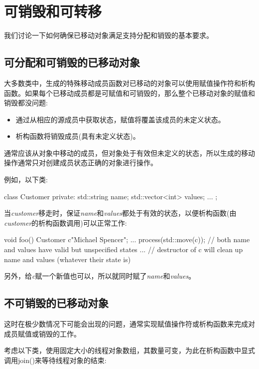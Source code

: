 \section{可销毁和可转移}
我们讨论一下如何确保已移动对象满足支持分配和销毁的基本要求。

\subsection{可分配和可销毁的已移动对象}

大多数类中，生成的特殊移动成员函数对已移动的对象可以使用赋值操作符和析构函数。如果每个已移动成员都是可赋值和可销毁的，那么整个已移动对象的赋值和销毁都没问题:

\begin{itemize}
	\item 通过从相应的源成员中获取状态，赋值将覆盖该成员的未定义状态。
	\item 析构函数将销毁成员(具有未定义状态)。
\end{itemize}

通常应该从对象中移动的成员，但对象处于有效但未定义的状态，所以生成的移动操作通常只对创建成员状态正确的对象进行操作。

例如，以下类:

\begin{cppcode}
class Customer {
private:
	std::string name;
	std::vector<int> values;
	...
};
\end{cppcode}

当\textit{customer}移走时，保证\textit{name}和\textit{values}都处于有效的状态，以便析构函数(由\textit{customer}的析构函数调用)可以正常工作:

\begin{cppcode}
void foo()
{
	Customer c{"Michael Spencer"};
	...
	process(std::move(c));
	// both name and values have valid but unspecified states
	...
} // destructor of c will clean up name and values (whatever their state is)
\end{cppcode}

另外，给\textit{c}赋一个新值也可以，所以就同时赋了\textit{name}和\textit{values}。

\subsection{不可销毁的已移动对象}

这时在极少数情况下可能会出现的问题，通常实现赋值操作符或析构函数来完成对成员赋值或销毁的工作。

考虑以下类，使用固定大小的线程对象数组，其数量可变，为此在析构函数中显式调用join()来等待线程对象的结束:

